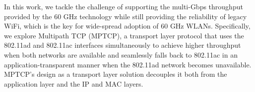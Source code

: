 In this work, we tackle the challenge of supporting the multi-Gbps
throughput provided by the 60 GHz technology while still providing
the reliability of legacy WiFi, which is the key for wide-spread adoption of 60 GHz WLANs.
Specifically, we explore Multipath TCP (MPTCP), a
transport layer protocol that uses the 802.11ad and 802.11ac interfaces simultaneously to 
achieve higher throughput when both networks are available and seamlessly falls back to 
802.11ac in an application-transparent manner when the 802.11ad network becomes unavailable. 
MPTCP's design as a transport layer solution
decouples it both from the
application layer and the IP and MAC layers.
\begin{comment}
In contrast, solutions that try to achieve
a similar functionality at the MAC or lower layers, such as 802.11ad's
Fast Session Transfer (FST)~\cite{80211ad}, are invariably tied to the
802.11 specifications and hence are not future proof. More
importantly, MPTCP by design provides the same guarantees to
applications as single-path TCP (SPTCP) in terms of packet delivery and
includes mechanisms to deal with issues such as packet re-ordering
among different interfaces that would otherwise need to be
addressed by any solution implemented at lower layers of the stack,
thus avoiding an unnecessary duplication of functionality.
\end{comment}

